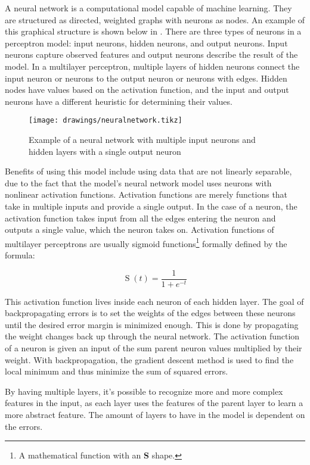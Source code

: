 A neural network is a computational model capable of machine learning. They are structured as directed, weighted graphs with neurons as nodes. An example of this graphical structure is shown below in . There are three types of neurons in a perceptron model: input neurons, hidden neurons, and output neurons. Input neurons capture observed features and output neurons describe the result of the model. In a multilayer perceptron, multiple layers of hidden neurons connect the input neuron or neurons to the output neuron or neurons with edges. Hidden nodes have values based on the activation function, and the input and output neurons have a different heuristic for determining their values.

\begin{figure}[!htb]
\centering
\texttt{[image: drawings/neuralnetwork.tikz]}
\label{fig:neuralNetworkModel}
\caption{Example of a neural network with multiple input neurons and hidden layers with a single output neuron}
\end{figure}

Benefits of using this model include using data that are not linearly separable, due to the fact that the model's neural network model uses neurons with nonlinear activation functions. Activation functions are merely functions that take in multiple inputs and provide a single output. In the case of a neuron, the activation function takes input from all the edges entering the neuron and outputs a single value, which the neuron takes on. Activation functions of multilayer perceptrons are usually sigmoid functions\footnote{A mathematical function with an \textbf{S} shape.} formally defined by the formula:

\[
  \operatorname{S}(t) = \frac{1}{1+e^{-t}}
\]

This activation function lives inside each neuron of each hidden layer. The goal of backpropagating errors is to set the weights of the edges between these neurons until the desired error margin is minimized enough. This is done by propagating the weight changes back up through the neural network. The activation function of a neuron is given an input of the sum parent neuron values multiplied by their weight. With backpropagation, the gradient descent method is used to find the local minimum and thus minimize the sum of squared errors.

By having multiple layers, it's possible to recognize more and more complex features in the input, as each layer uses the features of the parent layer to learn a more abstract feature. The amount of layers to have in the model is dependent on the errors.

